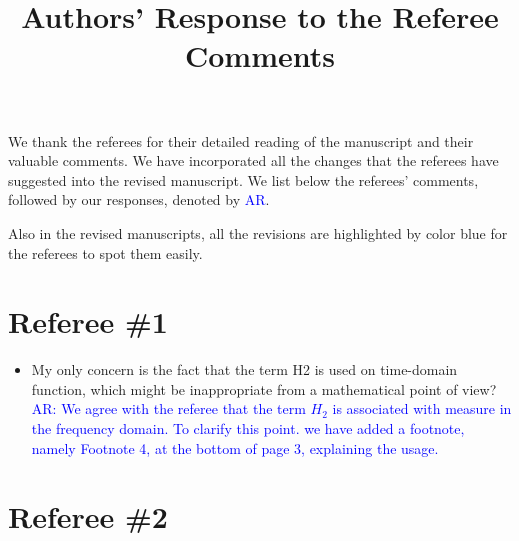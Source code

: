 \documentclass[11pt]{article}
\title{Authors' Response to the Referee Comments}
\author{}
\date{}
\def\serkan#1{\textcolor{blue}{{#1}}}
\begin{document}
\maketitle

We thank the referees {for their detailed reading of the manuscript and their valuable comments}.
 We have incorporated all the changes that the referees have suggested into the revised
manuscript.   We list below the referees' comments, followed by our responses, denoted by \serkan{\textsf{AR}}.  

Also in the revised manuscripts, all the revisions  are highlighted by color blue for the referees to spot them easily.

\section*{Referee \#1}%

\begin{itemize}
\item My only concern is the fact that the term H2 is used on time-domain
function, which might be inappropriate from a mathematical point of
view?\\[1ex]
\serkan{\textsf{AR}: We agree with the referee that the term $H_2$ is associated with measure in the frequency domain. To clarify this point. we have added a footnote, namely Footnote 4, at the bottom of page 3, explaining the usage.
} 
\end{itemize}

\section*{Referee \#2}
\end{document}
